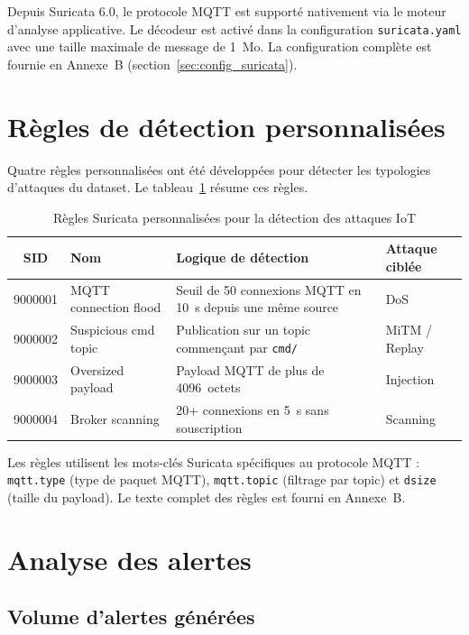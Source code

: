 Depuis Suricata 6.0, le protocole MQTT est supporté nativement via le moteur d'analyse applicative. Le décodeur est activé dans la configuration \texttt{suricata.yaml} avec une taille maximale de message de 1~Mo. La configuration complète est fournie en Annexe~B (section~\ref{sec:config_suricata}).

\section{Règles de détection personnalisées}

Quatre règles personnalisées ont été développées pour détecter les typologies d'attaques du dataset. Le tableau~\ref{tab:regles_suricata} résume ces règles.

\begin{table}[H]
\centering
\caption{Règles Suricata personnalisées pour la détection des attaques IoT}
\label{tab:regles_suricata}
\begin{tabular}{clp{4.5cm}l}
\toprule
\textbf{SID} & \textbf{Nom} & \textbf{Logique de détection} & \textbf{Attaque ciblée} \\
\midrule
9000001 & MQTT connection flood & Seuil de 50 connexions MQTT en 10~s depuis une même source & DoS \\
9000002 & Suspicious cmd topic & Publication sur un topic commençant par \texttt{cmd/} & MiTM / Replay \\
9000003 & Oversized payload & Payload MQTT de plus de 4096~octets & Injection \\
9000004 & Broker scanning & 20+ connexions en 5~s sans souscription & Scanning \\
\bottomrule
\end{tabular}
\end{table}

Les règles utilisent les mots-clés Suricata spécifiques au protocole MQTT : \texttt{mqtt.type} (type de paquet MQTT), \texttt{mqtt.topic} (filtrage par topic) et \texttt{dsize} (taille du payload). Le texte complet des règles est fourni en Annexe~B.

\section{Analyse des alertes}

\subsection{Volume d'alertes générées}

